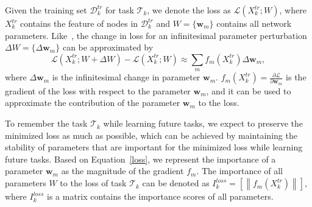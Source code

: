 \documentclass[letterpaper]{article} %
\newcommand{\xw}[1]{\textcolor{blue}{#1}}
\begin{document}
Given the training set $\mathcal{D}_k^{tr}$
for task $\mathcal{T}_k$, 
we denote the loss as $\mathcal{L}(X_k^{tr};W)$, 
where $X_k^{tr}$ contains the feature of nodes in $\mathcal{D}_k^{tr}$ and $W=\{\boldsymbol{w}_m\}$ contains all network parameters. 
Like~\cite{zenke2017continual}, the change in loss for an infinitesimal parameter perturbation $\Delta W =\{\Delta \boldsymbol{w}_m\}$ can be approximated by
\begin{equation}
\label{loss}
  \mathcal{L}(X_k^{tr};W+ \Delta W)-\mathcal{L}(X_k^{tr};W) \approx \sum_m f_m(X_k^{tr}) \Delta \boldsymbol{w}_m,
\end{equation}
where $\Delta \boldsymbol{w}_m$ is the infinitesimal change in parameter $\boldsymbol{w}_m$.  $f_m(X_k^{tr})=\frac{\partial \mathcal{L}}{\partial{\boldsymbol{w}_m}}$ is the gradient of the loss with respect to the parameter $\boldsymbol{w}_m$, and it can be used to approximate the contribution of the parameter $\boldsymbol{w}_m$ to the loss.

To remember the task $\mathcal{T}_k$ while learning future tasks, we expect to preserve the 
minimized loss as much as possible, 
which can be achieved by
maintaining the stability of parameters that are important for the minimized loss while learning future tasks.
Based on Equation~\ref{loss}, 
we represent the importance of a parameter $\boldsymbol{w}_m$ 
as the magnitude of the gradient $f_m$.  
The importance of all parameters $W$ to the loss
of task $\mathcal{T}_k$ can be denoted as 
$I_{k}^{loss}=[\left \|f_m(X_k^{tr})\right \|]$, 
where $I_{k}^{loss}$ is a matrix contains the importance scores of all parameters.
\end{document}
